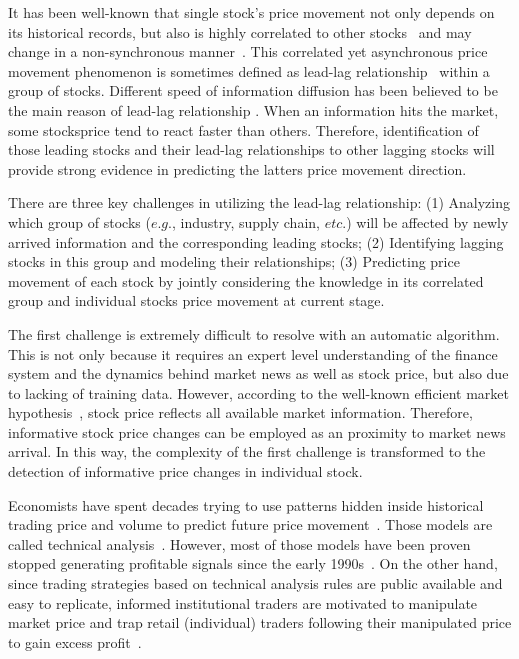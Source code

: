 \documentclass[sigconf]{acmart}
\renewcommand{\cite}{\citep}
\begin{document}
It has been well-known that single stock's price movement not only depends on its historical records, but also is highly correlated to other stocks~\cite{lo1990contrarian,mech1993portfolio} and may change in a non-synchronous
manner~\cite{lo1990contrarian,brennan1993investment}. This correlated yet asynchronous price movement phenomenon is sometimes defined as lead-lag relationship~\cite{hou2007industry} within a group of stocks.
Different speed of information diffusion has been believed to be
the main reason of lead-lag relationship
\cite{lo1990contrarian,badrinath1995shepherds,mcqueen1996delayed}.
When an information hits the market, some stocks\textquotesingle price tend to
react faster than others. Therefore, identification of those
leading stocks and their lead-lag relationships to other lagging
stocks will provide strong evidence in predicting the latter\textquotesingle s
price movement direction.

There are three key challenges in utilizing the lead-lag relationship: (1) Analyzing which group of stocks ($e.g.$, industry,
supply chain, $etc.$) will be affected by newly arrived information
and the corresponding leading stocks; (2) Identifying lagging stocks in this group and modeling their relationships; (3) Predicting
price movement of each stock by jointly considering the knowledge in its correlated group and individual stock\textquotesingle s price movement at current stage.

The first challenge is extremely difficult to resolve with an automatic algorithm. This is not only because it requires an expert level understanding of the finance system and the dynamics behind market news as well as stock price, but also due to lacking of training data. However, according to the well-known efficient market hypothesis~\cite{malkiel1970efficient}, stock price reflects all
available market information. Therefore, informative stock price changes can be employed as an proximity to market news arrival. In this way, the complexity of the first challenge is transformed to the detection of informative price changes in individual stock.

Economists have spent decades trying to use patterns hidden
inside historical trading price and volume to predict future
price movement~\cite{fama1966filter,jensen1967random}. Those
models are called technical
analysis~\cite{kirkpatrick2010technical}. However, most of those
models have been proven stopped generating profitable signals
since the early 1990s~\cite{park2007we}. On the other hand, since
trading strategies based on technical analysis rules are public
available and easy to replicate, informed institutional traders
are motivated to manipulate market price and trap retail
(individual) traders following their manipulated price to gain
excess profit~\cite{sun2016decision}.
\end{document}
